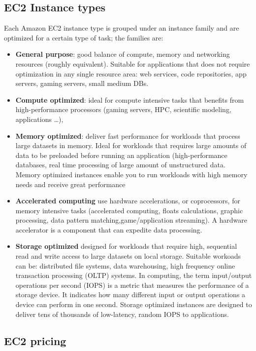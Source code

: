 \documentclass{article}
\theoremstyle{definition}
\begin{document}
\subsection{EC2 Instance types}
Each Amazon EC2 instance type is grouped under an instance family and are optimized for a certain type of task; the families are:
\begin{itemize}
\item \textbf{General purpose}: good balance of compute, memory and networking resources (roughly equivalent). Suitable for applications that does not require optimization in any single resource area: web services, code repositories, app servers, gaming servers, small medium DBs. 
\item \textbf{Compute optimized}: ideal for compute intensive tasks that benefits from high-performance processors (gaming servers, HPC, scientific modeling, applications \dots),
\item \textbf{Memory optimized}: deliver fast performance for workloads that process large datasets in memory. Ideal for workloads that requires large amounts of data to be preloaded before running an application (high-performance databases, real time processing of large amount of unstructured data. Memory optimized instances enable you to run workloads with high memory  needs and receive great performance
\item \textbf{Accelerated computing} use hardware accelerations, or coprocessors, for memory intensive tasks (accelerated computing, floats calculations, graphic processing, data pattern matching,game/application streaming). A hardware accelerator is a component that can expedite data processing.
\item \textbf{Storage optimized} designed for workloads that require high, sequential read and write access to large datasets on local storage. Suitable workoads can be: distributed file systems, data warehousing, high frequency online transaction processing (OLTP) systems. In computing, the term input/output operations per second (IOPS) is a metric that measures the performance of a storage device. It indicates how many different input or output operations a device can perform in one second. Storage optimized instances are designed to deliver tens of thousands of low-latency, random IOPS to applications.
\end{itemize}


\subsection{EC2 pricing}
\end{document}
